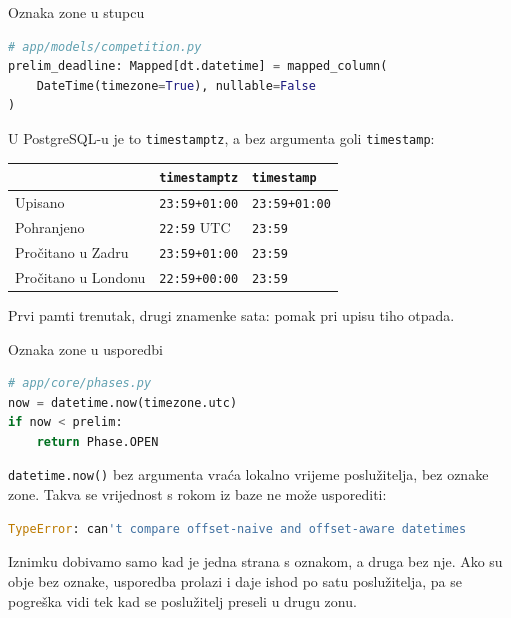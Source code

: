 \begin{frame}[fragile]{Oznaka zone u stupcu}
\begin{lstlisting}[language=python]
# app/models/competition.py
prelim_deadline: Mapped[dt.datetime] = mapped_column(
    DateTime(timezone=True), nullable=False
)
\end{lstlisting}

\vspace{0.25em}
U PostgreSQL-u je to \texttt{timestamptz}, a bez argumenta goli \texttt{timestamp}:

\vspace{0.25em}
\begin{center}
{\small
\setlength{\tabcolsep}{6pt}
\renewcommand{\arraystretch}{1.3}
\begin{tabular}{@{}L{4.0cm}L{3.9cm}L{2.6cm}@{}}
  \toprule
   & \texttt{timestamptz} & \texttt{timestamp} \\
  \midrule
  Upisano             & \texttt{23:59+01:00} & \texttt{23:59+01:00} \\
  Pohranjeno          & \texttt{22:59} UTC   & \texttt{23:59} \\
  Pročitano u Zadru   & \texttt{23:59+01:00} & \texttt{23:59} \\
  Pročitano u Londonu & \texttt{22:59+00:00} & \texttt{23:59} \\
  \bottomrule
\end{tabular}
}
\end{center}

\vspace{0.25em}
Prvi pamti trenutak, drugi znamenke sata: pomak pri upisu tiho otpada.
\end{frame}

\begin{frame}[fragile]{Oznaka zone u usporedbi}
\begin{lstlisting}[language=python]
# app/core/phases.py
now = datetime.now(timezone.utc)
if now < prelim:
    return Phase.OPEN
\end{lstlisting}

\vspace{0.3em}
\texttt{datetime.now()} bez argumenta vraća lokalno vrijeme poslužitelja, bez oznake zone. Takva se vrijednost s rokom iz baze ne može usporediti:

\begin{lstlisting}[language=python]
TypeError: can't compare offset-naive and offset-aware datetimes
\end{lstlisting}

\vspace{0.2em}
Iznimku dobivamo samo kad je jedna strana s oznakom, a druga bez nje. Ako su obje bez oznake, usporedba prolazi i daje ishod po satu poslužitelja, pa se pogreška vidi tek kad se poslužitelj preseli u drugu zonu.
\end{frame}

